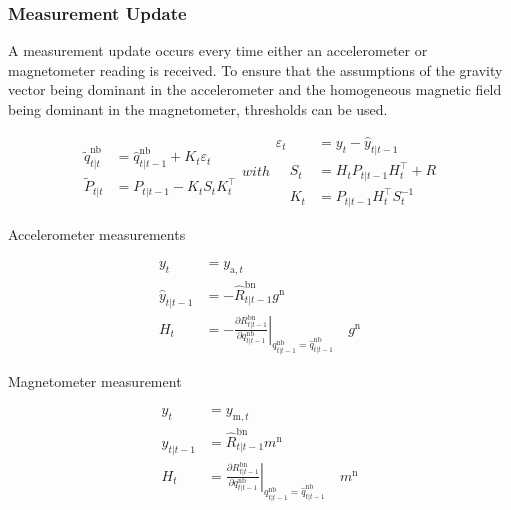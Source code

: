 \subsubsection{Measurement Update}

A measurement update occurs every time either an accelerometer or magnetometer reading is received. To ensure that the assumptions of the gravity vector being dominant in the accelerometer and the homogeneous magnetic field being dominant in the magnetometer, thresholds can be used.

\begin{subequations}
	\begin{align}
	\tilde{q}_{t | t}^{\mathrm{nb}} &=\hat{q}_{t | t-1}^{\mathrm{nb}}+K_{t} \varepsilon_{t} \\
	\tilde{P}_{t | t} &=P_{t | t-1}-K_{t} S_{t} K_{t}^{\top}
	\end{align}
	with	
	\begin{align}
	\varepsilon_{t} &= y_{t}-\hat{y}_{t | t-1}\\
	\quad S_{t} &= H_{t} P_{t | t-1} H_{t}^{\top}+R \\
	\quad K_{t} &= P_{t | t-1} H_{t}^{\top} S_{t}^{-1}
	\end{align}
	
\end{subequations}


Accelerometer measurements

\begin{subequations}
	\begin{align}
	y_{t}&=
	y_{\mathrm{a}, t} \\
	\hat{y}_{t | t-1}&=
	-\hat{R}_{t | t-1}^{\mathrm{bn}} g^{\mathrm{n}}\\
	H_{t}&=	-\left.\frac{\partial R_{t | t-1}^{\mathrm{bn}}}{\partial q_{t | t-1}^{\mathrm{nb}}}\right|_{{q_{t | t-1}^{\mathrm{nb}}}=\hat{q}_{t | t-1}^{\mathrm{nb}}} \quad g^{\mathrm{n}}
	\end{align}
\end{subequations}

Magnetometer measurement

\begin{subequations}
	\begin{align}
	y_{t}&=	y_{\mathrm{m}, t}\\
	\hat{y}_{t | t-1}&=	\hat{R}_{t | t-1}^{\mathrm{bn}} m^{\mathrm{n}}\\
	H_{t}&=	\left.\frac{\partial R_{t | t-1}^{\mathrm{bn}}}{\partial q_{t | t-1}^{\mathrm{nb}}}\right|_{{q_{t | t-1}^{\mathrm{nb}}}=\hat{q}_{t | t-1}^{\mathrm{nb}}} \quad m^{\mathrm{n}}
	\end{align}
\end{subequations}

